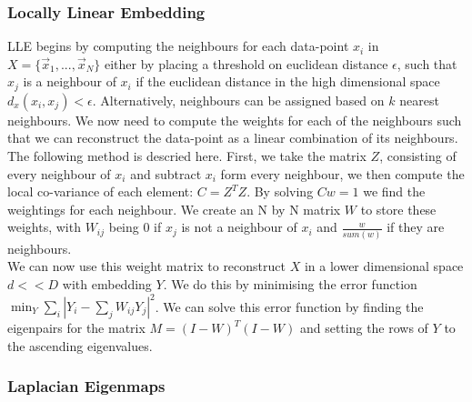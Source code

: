 \documentclass{article}
\begin{document}
\subsubsection{Locally Linear Embedding}
LLE begins by computing the neighbours for each data-point $x_i$ in $X = \{\vec{x}_1,...,\vec{x}_N\}$ either by placing a threshold on euclidean distance $\epsilon$, such that $x_j$ is a neighbour of $x_i$ if the euclidean distance in the high dimensional space $d_x(x_i,x_j) < \epsilon$. Alternatively, neighbours can be assigned based on $k$ nearest neighbours. We now need to compute the weights for each of the neighbours such that we can reconstruct the data-point as a linear combination of its neighbours. The following method is descried here.\cite{LLERoweis} First, we take the matrix $Z$, consisting of every neighbour of $x_i$ and subtract $x_i$ form every neighbour, we then compute the local co-variance of each element: $C = Z^TZ$. By solving $Cw = 1$ we find the weightings for each neighbour. We create an N by N matrix $W$ to store these weights, with $W_{ij}$ being 0 if $x_j$ is not a neighbour of $x_i$ and $\frac{w}{sum(w)}$ if they are neighbours.\\
We can now use this weight matrix to reconstruct $X$ in a lower dimensional space $d<<D$ with embedding $Y$. We do this by minimising the error function $\min_Y\sum\limits_{i}|Y_i-\sum\limits_{j}W_{ij}Y_j|^2$.\cite{ghodsi2006dimensionality} We can solve this error function by finding the eigenpairs for the matrix $M = (I-W)^T(I-W)$ and setting the rows of $Y$ to the ascending eigenvalues.
\subsubsection{Laplacian Eigenmaps}
\end{document}
